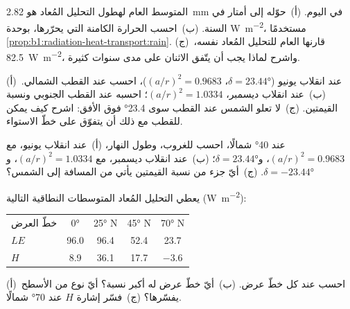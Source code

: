 \begin{exercise}[$\star$]\label{exo:b1:radiation-heat-transport:4}
المتوسط العام لهطول التحليل المُعاد هو \qty{2.82}{mm} في اليوم. (أ)~حوّله إلى أمتار في السنة. (ب)~احسب الحرارة الكامنة التي يحرّرها، بوحدة \unit{W.m^{-2}}، مستخدمًا \cref{prop:b1:radiation-heat-transport:rain}. (ج)~قارنها  العام للتحليل المُعاد نفسه، \qty{82.5}{W.m^{-2}}، واشرح لماذا يجب أن يتّفق الاثنان على مدى سنوات كثيرة.
\end{exercise}

\begin{exercise}[$\star\star$]\label{exo:b1:radiation-heat-transport:5}
(أ)~عند انقلاب يونيو ($\delta = \ang{23.44}$، $(a/r)^2 = 0.9683$)، احسب  عند القطب الشمالي. (ب)~عند انقلاب ديسمبر، $(a/r)^2 =
1.0334$؛ احسبه عند القطب الجنوبي ونسبة القيمتين. (ج)~لا تعلو الشمس عند القطب سوى \ang{23.4} فوق الأفق: اشرح كيف يمكن للقطب مع ذلك أن يتفوّق على خطّ الاستواء.
\end{exercise}

\begin{exercise}[$\star\star$]\label{exo:b1:radiation-heat-transport:6}
عند \ang{40} شمالًا، احسب  للغروب، وطول النهار،  (أ)~عند انقلاب يونيو، مع $(a/r)^2 = 0.9683$، و$\delta =
\ang{23.44}$؛ (ب)~عند انقلاب ديسمبر، مع $(a/r)^2 = 1.0334$، و$\delta =
\ang{-23.44}$. (ج)~أيّ جزء من نسبة القيمتين يأتي من المسافة إلى الشمس؟
\end{exercise}

\begin{exercise}[$\star\star$]\label{exo:b1:radiation-heat-transport:7}
يعطي التحليل المُعاد المتوسطات النطاقية التالية (\unit{W.m^{-2}}):
\begin{center}
\small
\begin{tabular}{|l|cccc|}
\hline
خطّ العرض & \ang{0} & \ang{25} N & \ang{45} N & \ang{70} N \\
$LE$ & 96.0 & 96.4 & 52.4 & 23.7 \\
$H$ & 8.9 & 36.1 & 17.7 & $-3.6$ \\
\hline
\end{tabular}
\end{center}
(أ)~احسب  عند كل خطّ عرض. (ب)~أيّ خطّ عرض له أكبر
نسبة؟ أيّ نوع من الأسطح يفسّرها؟ (ج)~فسّر إشارة $H$ عند \ang{70} شمالًا.
\end{exercise}

